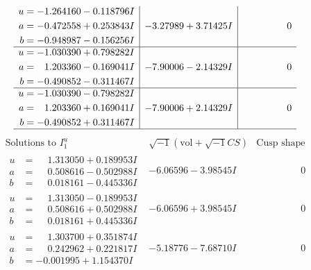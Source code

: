\documentclass[1p]{elsarticle_modified}
\theoremstyle{definition}
\newcommand{\I}{\sqrt{-1}}
\begin{document}
$$\begin{array}{c|c|c}
\begin{aligned}
u &= -1.264160 - 0.118796 I \\
a &= -0.472558 + 0.253843 I \\
b &= -0.948987 - 0.156256 I\end{aligned}
 & -3.27989 + 3.71425 I & \phantom{-0.000000 } 0 \\ \hline\begin{aligned}
u &= -1.030390 + 0.798282 I \\
a &= \phantom{-}1.203360 - 0.169041 I \\
b &= -0.490852 - 0.311467 I\end{aligned}
 & -7.90006 - 2.14329 I & \phantom{-0.000000 } 0 \\ \hline\begin{aligned}
u &= -1.030390 - 0.798282 I \\
a &= \phantom{-}1.203360 + 0.169041 I \\
b &= -0.490852 + 0.311467 I\end{aligned}
 & -7.90006 + 2.14329 I & \phantom{-0.000000 } 0\\
 \hline 
 \end{array}$$\newpage$$\begin{array}{c|c|c}  
\text{Solutions to }I^u_{1}& \I (\text{vol} + \sqrt{-1}CS) & \text{Cusp shape}\\
 \hline 
\begin{aligned}
u &= \phantom{-}1.313050 + 0.189953 I \\
a &= \phantom{-}0.508616 - 0.502988 I \\
b &= \phantom{-}0.018161 - 0.445336 I\end{aligned}
 & -6.06596 - 3.98545 I & \phantom{-0.000000 } 0 \\ \hline\begin{aligned}
u &= \phantom{-}1.313050 - 0.189953 I \\
a &= \phantom{-}0.508616 + 0.502988 I \\
b &= \phantom{-}0.018161 + 0.445336 I\end{aligned}
 & -6.06596 + 3.98545 I & \phantom{-0.000000 } 0 \\ \hline\begin{aligned}
u &= \phantom{-}1.303700 + 0.351874 I \\
a &= \phantom{-}0.242962 + 0.221817 I \\
b &= -0.001995 + 1.154370 I\end{aligned}
 & -5.18776 - 7.68710 I & \phantom{-0.000000 } 0 \\ \hline\begin{aligned}

\end{aligned}
\end{array}$$
\end{document}
